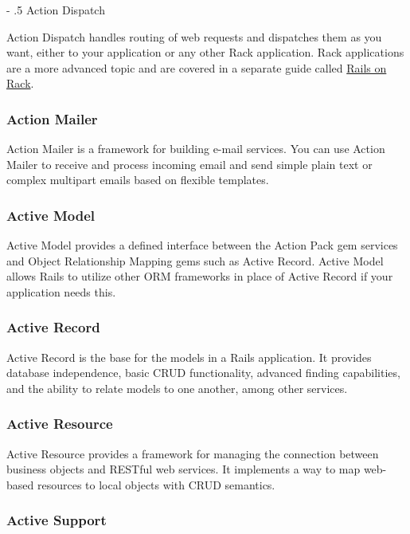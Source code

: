 \documentclass[10pt]{book}
\makeatletter
\renewcommand\paragraph{%
   \@startsection{paragraph}{4}{0mm}%
      {-\baselineskip}%
      {.5\baselineskip}%
      {\normalfont\scriptsize\bfseries}}
\makeatother
\begin{document}
\paragraph{ Action Dispatch}

Action Dispatch handles routing of web requests and dispatches them as you want, either to your application or any other Rack application.  Rack applications are a more advanced topic and are covered in a separate guide called \href{http://guides.rubyonrails.org/rails_on_rack.html}{Rails on Rack}.

\subsubsection{ Action Mailer}

Action Mailer is a framework for building e-mail services. You can use Action Mailer to receive and process incoming email and send simple plain text or complex multipart emails based on flexible templates.

\subsubsection{ Active Model}

Active Model provides a defined interface between the Action Pack gem services and Object Relationship Mapping gems such as Active Record. Active Model allows Rails to utilize other ORM frameworks in place of Active Record if your application needs this.

\subsubsection{ Active Record}

Active Record is the base for the models in a Rails application. It provides database independence, basic CRUD functionality, advanced finding capabilities, and the ability to relate models to one another, among other services.

\subsubsection{ Active Resource}

Active Resource provides a framework for managing the connection between business objects and RESTful web services. It implements a way to map web-based resources to local objects with CRUD semantics.

\subsubsection{ Active Support}
\end{document}

